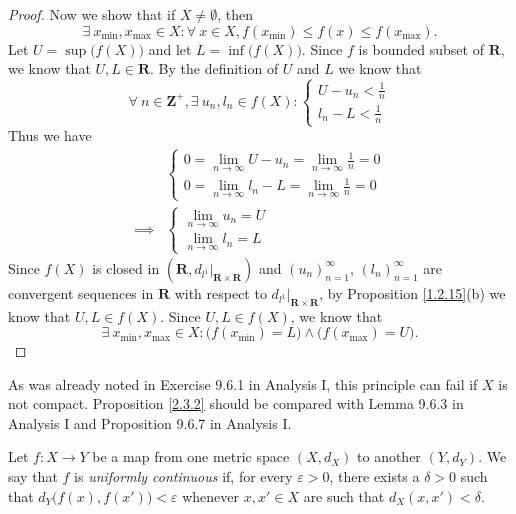 \begin{proof}
    Now we show that if \(X \neq \emptyset\), then
    \[
        \exists\ x_{\min}, x_{\max} \in X : \forall\ x \in X, f(x_{\min}) \leq f(x) \leq f(x_{\max}).
    \]
    Let \(U = \sup\big(f(X)\big)\) and let \(L = \inf\big(f(X)\big)\).
    Since \(f\) is bounded subset of \(\mathbf{R}\), we know that \(U, L \in \mathbf{R}\).
    By the definition of \(U\) and \(L\) we know that
    \[
        \forall\ n \in \mathbf{Z}^+, \exists\ u_n, l_n \in f(X) : \begin{cases}
            U - u_n < \frac{1}{n} \\
            l_n - L < \frac{1}{n}
        \end{cases}
    \]
    Thus we have
    \begin{align*}
                 & \begin{cases}
            0 = \lim_{n \to \infty} U - u_n = \lim_{n \to \infty} \frac{1}{n} = 0 \\
            0 = \lim_{n \to \infty} l_n - L = \lim_{n \to \infty} \frac{1}{n} = 0
        \end{cases} \\
        \implies & \begin{cases}
            \lim_{n \to \infty} u_n = U \\
            \lim_{n \to \infty} l_n = L
        \end{cases}
    \end{align*}
    Since \(f(X)\) is closed in \((\mathbf{R}, d_{l^1}|_{\mathbf{R} \times \mathbf{R}})\) and \((u_n)_{n = 1}^\infty\), \((l_n)_{n = 1}^\infty\) are convergent sequences in \(\mathbf{R}\) with respect to \(d_{l^1}|_{\mathbf{R} \times \mathbf{R}}\), by Proposition \ref{1.2.15}(b) we know that \(U, L \in f(X)\).
    Since \(U, L \in f(X)\), we know that
    \[
        \exists\ x_{\min}, x_{\max} \in X : \big(f(x_{\min}) = L\big) \land \big(f(x_{\max}) = U\big).
    \]
\end{proof}

\begin{remark}\label{2.3.3}
    As was already noted in Exercise 9.6.1 in Analysis I, this principle can fail if \(X\) is not compact.
    Proposition \ref{2.3.2} should be compared with Lemma 9.6.3 in Analysis I and Proposition 9.6.7 in Analysis I.
\end{remark}

\begin{definition}\label{2.3.4}
    Let \(f : X \to Y\) be a map from one metric space \((X, d_X)\) to another \((Y, d_Y)\).
    We say that \(f\) is \emph{uniformly continuous} if, for every \(\varepsilon > 0\), there exists a \(\delta > 0\) such that \(d_Y\big(f(x), f(x')\big) < \varepsilon\) whenever \(x, x' \in X\) are such that \(d_X(x, x') < \delta\).
\end{definition}

